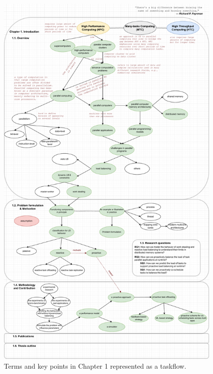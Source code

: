 \begin{figure}[t]
  \centering
  \includegraphics[scale=0.5]{./pictures/thesis_structure/taskflow_chapter1.pdf}
	\caption{Terms and key points in Chapter 1 represented as a taskflow.}
	\label{fig:thesistaskflow_chapter1}
\end{figure}


